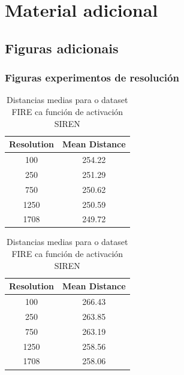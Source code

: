 \chapter{Material adicional}
\label{chap:adicional}

\section{Figuras adicionais}
\label{sec:figuras_adicionales}

\subsection{Figuras experimentos de resolución}
\label{subsec:figuras_experimentos_resolucion}

\begin{table}[h]
    \centering
    \begin{minipage}[t]{0.45\linewidth}
        \centering
        \scriptsize
        \setlength{\tabcolsep}{25pt}
        \begin{tabular}{|c|c|}
        \hline
        Resolution & Mean Distance \\ \hline
        100 & 254.22 \\ \hline
        250 & 251.29 \\ \hline
        750 & 250.62 \\ \hline
        1250 & 250.59 \\ \hline
        1708 & 249.72 \\ \hline
        \end{tabular}
        \caption{Distancias medias para o dataset FIRE ca función de activación Relu}
        \label{tab:mlp_mean_distances_fire}
    \end{minipage}
    \hfill
    \begin{minipage}[t]{0.45\linewidth}
        \centering
        \scriptsize
        \setlength{\tabcolsep}{25pt}
        \begin{tabular}{|c|c|}
        \hline
        Resolution & Mean Distance \\ \hline
        100 & 266.43 \\ \hline
        250 & 263.85 \\ \hline
        750 & 263.19 \\ \hline
        1250 & 258.56 \\ \hline
        1708 & 258.06 \\ \hline
        \end{tabular}
        \caption{Distancias medias para o dataset FIRE ca función de activación SIREN}
        \label{tab:siren_mean_distances_fire}
    \end{minipage}
\end{table}

